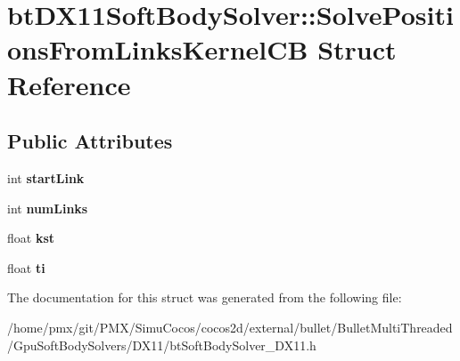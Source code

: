 \hypertarget{structbtDX11SoftBodySolver_1_1SolvePositionsFromLinksKernelCB}{}\section{bt\+D\+X11\+Soft\+Body\+Solver\+:\+:Solve\+Positions\+From\+Links\+Kernel\+CB Struct Reference}
\label{structbtDX11SoftBodySolver_1_1SolvePositionsFromLinksKernelCB}
\subsection*{Public Attributes}
\begin{DoxyCompactItemize}
\item 
\mbox{\label{structbtDX11SoftBodySolver_1_1SolvePositionsFromLinksKernelCB_a0f538155ae9eeebef1c840aa786dd509}} 
int {\bfseries start\+Link}
\item 
\mbox{\label{structbtDX11SoftBodySolver_1_1SolvePositionsFromLinksKernelCB_acd1e00e58ad5d02a159c343b3656c91a}} 
int {\bfseries num\+Links}
\item 
\mbox{\label{structbtDX11SoftBodySolver_1_1SolvePositionsFromLinksKernelCB_ac08f22d189978817fbb25c4b59531cef}} 
float {\bfseries kst}
\item 
\mbox{\label{structbtDX11SoftBodySolver_1_1SolvePositionsFromLinksKernelCB_a674fcc3660e393c8ca40eb760710a293}} 
float {\bfseries ti}
\end{DoxyCompactItemize}


The documentation for this struct was generated from the following file\+:\begin{DoxyCompactItemize}
\item 
/home/pmx/git/\+P\+M\+X/\+Simu\+Cocos/cocos2d/external/bullet/\+Bullet\+Multi\+Threaded/\+Gpu\+Soft\+Body\+Solvers/\+D\+X11/bt\+Soft\+Body\+Solver\+\_\+\+D\+X11.\+h\end{DoxyCompactItemize}
